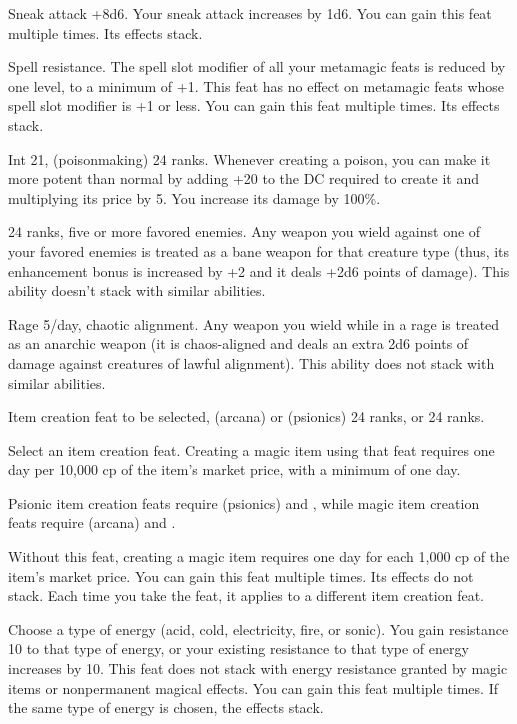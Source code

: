 {}
{Sneak attack +8d6.}
{Your sneak attack increases by 1d6.}
{}{You can gain this feat multiple times. Its effects stack.}

{}
{Spell resistance.}
{The spell slot modifier of all your metamagic feats is reduced by one level, to a minimum of +1. This feat has no effect on metamagic feats whose spell slot modifier is +1 or less.}
{}{You can gain this feat multiple times. Its effects stack.}

{Int 21,  (poisonmaking) 24 ranks.}
{Whenever creating a poison, you can make it more potent than normal by adding +20 to the DC required to create it and multiplying its price by 5. You increase its damage by 100\%.}

{ 24 ranks, five or more favored enemies.}
{Any weapon you wield against one of your favored enemies is treated as a bane weapon for that creature type (thus, its enhancement bonus is increased by +2 and it deals +2d6 points of damage). This ability doesn't stack with similar abilities.}

{Rage 5/day, chaotic alignment.}
{Any weapon you wield while in a rage is treated as an anarchic weapon (it is chaos-aligned and deals an extra 2d6 points of damage against creatures of lawful alignment). This ability does not stack with similar abilities.}



{}
{
Item creation feat to be selected,  (arcana) or  (psionics) 24 ranks,  or  24 ranks.}
{Select an item creation feat. Creating a magic item using that feat requires one day per 10,000 cp of the item's market price, with a minimum of one day.

Psionic item creation feats require  (psionics) and , while magic item creation feats require  (arcana) and .
}
{Without this feat, creating a magic item requires one day for each 1,000 cp of the item's market price.}
{You can gain this feat multiple times. Its effects do not stack. Each time you take the feat, it applies to a different item creation feat.}

{}{}
{Choose a type of energy (acid, cold, electricity, fire, or sonic). You gain resistance 10 to that type of energy, or your existing resistance to that type of energy increases by 10. This feat does not stack with energy resistance granted by magic items or nonpermanent magical effects.}
{}{You can gain this feat multiple times. If the same type of energy is chosen, the effects stack.}

